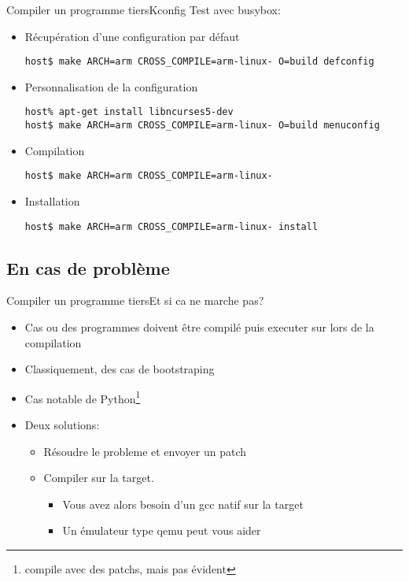 \begin{frame}[fragile=singleslide]{Compiler un programme tiers}{Kconfig}
  Test avec busybox:
  \begin{itemize}
  \item Récupération d'une configuration par défaut
\begin{lstlisting}
host$ make ARCH=arm CROSS_COMPILE=arm-linux- O=build defconfig
\end{lstlisting} %
  \item Personnalisation de la configuration
\begin{lstlisting}
host% apt-get install libncurses5-dev
host$ make ARCH=arm CROSS_COMPILE=arm-linux- O=build menuconfig
\end{lstlisting} %
  \item Compilation
\begin{lstlisting}
host$ make ARCH=arm CROSS_COMPILE=arm-linux-
\end{lstlisting} %
  \item Installation
\begin{lstlisting}
host$ make ARCH=arm CROSS_COMPILE=arm-linux- install
\end{lstlisting} %
  \end{itemize}
\end{frame}

\subsection{En cas de problème}

\begin{frame}{Compiler un programme tiers}{Et si ca ne marche pas?}
  \begin{itemize}
  \item Cas ou  des programmes doivent être compilé  puis executer sur
    lors de la compilation
  \item Classiquement, des cas de bootstraping
  \item Cas  notable de Python\footnote{compile avec  des patchs, mais
      pas évident}
  \item Deux solutions:
    \begin{itemize}
    \item Résoudre le probleme et envoyer un patch
    \item Compiler sur la target.
      \begin{itemize}
      \item Vous avez alors besoin d'un gcc natif sur la target
      \item Un émulateur type qemu peut vous aider
      \end{itemize}
    \end{itemize}
  \end{itemize}
\end{frame}

